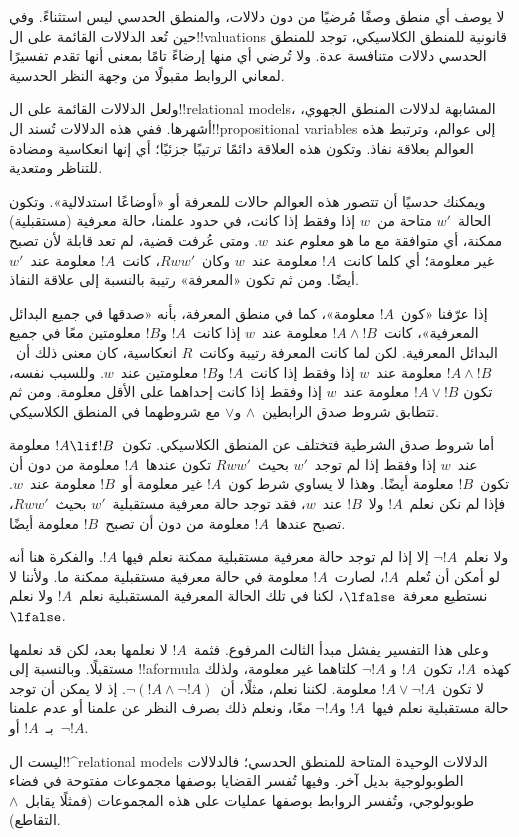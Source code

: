\documentclass[../../../include/open-logic-section]{subfiles}
\begin{document}


لا يوصف أي منطق وصفًا مُرضيًا من دون دلالات، والمنطق الحدسي ليس استثناءً.
وفي حين تُعد الدلالات القائمة على ال!!{valuation}s قانونية للمنطق
الكلاسيكي، توجد للمنطق الحدسي دلالات متنافسة عدة. ولا تُرضي أي منها إرضاءً
تامًا بمعنى أنها تقدم تفسيرًا لمعاني الروابط مقبولًا من وجهة النظر الحدسية.

ولعل الدلالات القائمة على ال!!{relational model}s، المشابهة لدلالات المنطق
الجهوي، أشهرها. ففي هذه الدلالات تُسند ال!!{propositional variable}s إلى
عوالم، وترتبط هذه العوالم بعلاقة نفاذ. وتكون هذه العلاقة دائمًا ترتيبًا
جزئيًا؛ أي إنها انعكاسية ومضادة للتناظر ومتعدية.

ويمكنك حدسيًا أن تتصور هذه العوالم حالات للمعرفة أو «أوضاعًا استدلالية».
وتكون الحالة~$w'$ متاحة من~$w$ إذا وفقط إذا كانت، في حدود علمنا، حالة
معرفية (مستقبلية) ممكنة، أي متوافقة مع ما هو معلوم عند~$w$. ومتى عُرفت
قضية، لم تعد قابلة لأن تصبح غير معلومة؛ أي كلما كانت~$!A$ معلومة عند~$w$
وكان~$Rww'$، كانت~$!A$ معلومة عند~$w'$ أيضًا. ومن ثم تكون «المعرفة»
رتيبة بالنسبة إلى علاقة النفاذ.

إذا عرّفنا «كون~$!A$ معلومة»، كما في منطق المعرفة، بأنه «صدقها في جميع
البدائل المعرفية»، كانت~$!A \land !B$ معلومة عند~$w$ إذا كانت~$!A$
و$!B$ معلومتين معًا في جميع البدائل المعرفية. لكن لما كانت المعرفة رتيبة
وكانت~$R$ انعكاسية، كان معنى ذلك أن~$!A \land !B$ معلومة عند~$w$ إذا
وفقط إذا كانت~$!A$ و$!B$ معلومتين عند~$w$. وللسبب نفسه، تكون
$!A \lor !B$ معلومة عند~$w$ إذا وفقط إذا كانت إحداهما على الأقل معلومة.
ومن ثم تتطابق شروط صدق الرابطين~$\land$ و$\lor$ مع شروطهما في المنطق
الكلاسيكي.

أما شروط صدق الشرطية فتختلف عن المنطق الكلاسيكي. تكون~$!A \lif !B$
معلومة عند~$w$ إذا وفقط إذا لم توجد~$w'$ بحيث~$Rww'$ تكون عندها~$!A$
معلومة من دون أن تكون~$!B$ معلومة أيضًا. وهذا لا يساوي شرط كون~$!A$ غير
معلومة أو~$!B$ معلومة عند~$w$. فإذا لم نكن نعلم~$!A$ ولا~$!B$ عند~$w$،
فقد توجد حالة معرفية مستقبلية~$w'$ بحيث~$Rww'$، تصبح عندها~$!A$ معلومة
من دون أن تصبح~$!B$ معلومة أيضًا.

ولا نعلم~$\lnot !A$ إلا إذا لم توجد حالة معرفية مستقبلية ممكنة نعلم فيها
$!A$. والفكرة هنا أنه لو أمكن أن تُعلم~$!A$، لصارت~$!A$ معلومة في حالة
معرفية مستقبلية ممكنة ما. ولأننا لا نستطيع معرفة~$\lfalse$، لكنا في تلك
الحالة المعرفية المستقبلية نعلم~$!A$ ولا نعلم~$\lfalse$.

وعلى هذا التفسير يفشل مبدأ الثالث المرفوع. فثمة~$!A$ لا نعلمها بعد، لكن قد
نعلمها مستقبلًا. وبالنسبة إلى !!a{formula} كهذه~$!A$، تكون~$!A$ و
$\lnot !A$ كلتاهما غير معلومة، ولذلك لا تكون~$!A \lor \lnot !A$
معلومة. لكننا نعلم، مثلًا، أن~$\lnot(!A \land \lnot !A)$. إذ لا يمكن أن
توجد حالة مستقبلية نعلم فيها~$!A$ و$\lnot !A$ معًا، ونعلم ذلك بصرف النظر
عن علمنا أو عدم علمنا بـ~$!A$ أو~$\lnot !A$.

ليست ال!!^{relational model}s الدلالات الوحيدة المتاحة للمنطق الحدسي؛
فالدلالات الطوبولوجية بديل آخر. وفيها تُفسر القضايا بوصفها مجموعات مفتوحة
في فضاء طوبولوجي، وتُفسر الروابط بوصفها عمليات على هذه المجموعات (فمثلًا
يقابل~$\land$ التقاطع).
\end{document}
